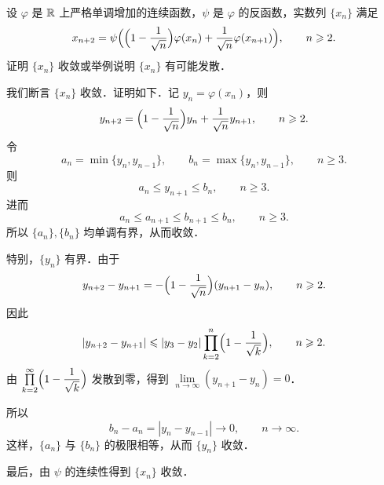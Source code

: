 设 $\varphi$ 是 $\mathbb{R}$ 上严格单调增加的连续函数，$\psi$ 是 $\varphi$ 的反函数，实数列 $\{x_n\}$ 满足
\[
  x_{n+2}=\psi\Bigl(\Bigl(1-\frac{1}{\sqrt{n}}\Bigr)\varphi(x_n)+\frac{1}{\sqrt{n}}\varphi(x_{n+1})\Bigr),\qquad n\geqslant 2.
\]
证明 $\{x_n\}$ 收敛或举例说明 $\{x_n\}$ 有可能发散．
\begin{solution}
我们断言 $\{x_n\}$ 收敛．证明如下．记 $y_n=\varphi(x_n)$，则
\[
  y_{n+2}=\Bigl(1-\frac{1}{\sqrt{n}}\Bigr)y_n+\frac{1}{\sqrt{n}}y_{n+1},\qquad n\geqslant 2.
\]
令
\[
  a_n=\min\{y_n,y_{n-1}\},\qquad b_n=\max\{y_n,y_{n-1}\},\qquad n\geqslant 3.
\]
则
\[
  a_n\leqslant y_{n+1}\leqslant b_n,\qquad n\geqslant 3.
\]
进而
\[
  a_n\leqslant a_{n+1}\leqslant b_{n+1}\leqslant b_n,\qquad n\geqslant 3.
\]
所以 $\{a_n\},\{b_n\}$ 均单调有界，从而收敛．

特别，$\{y_n\}$ 有界．由于
\[
  y_{n+2}-y_{n+1}=-\Bigl(1-\frac{1}{\sqrt{n}}\Bigr)(y_{n+1}-y_n),\qquad n\geqslant 2.
\]
因此
\[
  |y_{n+2}-y_{n+1}|\leqslant |y_3-y_2|\prod_{k=2}^{n}\Bigl(1-\frac{1}{\sqrt{k}}\Bigr),\qquad n\geqslant 2.
\]
由 $\prod\limits_{k=2}^{\infty}\Bigl(1-\dfrac{1}{\sqrt{k}}\Bigr)$ 发散到零，得到 $\lim\limits_{n\to\infty}(y_{n+1}-y_n)=0$．

所以
\[
  b_n-a_n=|y_n-y_{n-1}|\to 0,\qquad n\to\infty.
\]
这样，$\{a_n\}$ 与 $\{b_n\}$ 的极限相等，从而 $\{y_n\}$ 收敛．

最后，由 $\psi$ 的连续性得到 $\{x_n\}$ 收敛．
\end{solution}

